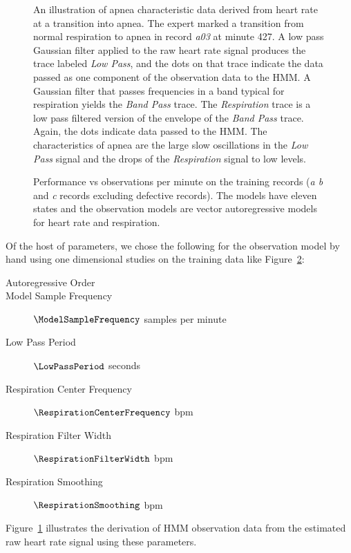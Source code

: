 \begin{figure}
  \caption[Apnea characteristics derived from estimated heart rate
  signal.]{An illustration of apnea characteristic data derived from
    heart rate at a transition into apnea.  The expert marked a
    transition from normal respiration to apnea in record \emph{a03}
    at minute 427.  A low pass Gaussian filter applied to the raw
    heart rate signal produces the trace labeled \emph{Low Pass}, and
    the dots on that trace indicate the data passed as one component
    of the observation data to the HMM.  A Gaussian filter that passes
    frequencies in a band typical for respiration yields the
    \emph{Band Pass} trace.  The \emph{Respiration} trace is a low
    pass filtered version of the envelope of the \emph{Band Pass}
    trace.  Again, the dots indicate data passed to the HMM.  The
    characteristics of apnea are the large slow oscillations in the
    \emph{Low Pass} signal and the drops of the \emph{Respiration}
    signal to low levels.}
  \label{fig:explore}
\end{figure}

\begin{figure}
  \caption[Error rate as a function of sample frequency.]{Performance
    vs observations per minute on the training records (\emph{a b} and
    \emph{c} records excluding defective records). The models have
    eleven states and the observation models are vector autoregressive
    models for heart rate and respiration.}
  \label{fig:errors_vs_fs}
\end{figure}

Of the host of parameters, we chose the following for the observation
model by hand using one dimensional studies on the training data like
Figure~\ref{fig:errors_vs_fs}:
\begin{description}
\item[Autoregressive Order] \ArOrder
\item[Model Sample Frequency] $\ModelSampleFrequency$ samples per minute
\item[Low Pass Period] $\LowPassPeriod$ seconds
\item[Respiration Center Frequency] $\RespirationCenterFrequency$ bpm
\item[Respiration Filter Width] $\RespirationFilterWidth$ bpm
\item[Respiration Smoothing] $\RespirationSmoothing$ bpm
\end{description}
Figure~\ref{fig:explore} illustrates the derivation of HMM observation
data from the estimated raw heart rate signal using these parameters.

